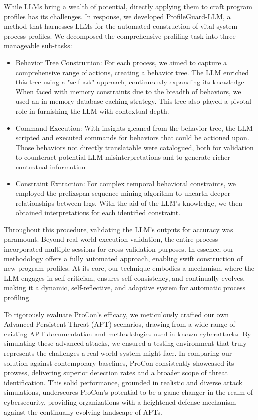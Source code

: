 While LLMs bring a wealth of potential, directly applying them to craft program profiles has its challenges. In response, we developed ProfileGuard-LLM, a method that harnesses LLMs for the automated construction of vital system process profiles. We decomposed the comprehensive profiling task into three manageable sub-tasks:
\begin{itemize}
    \item Behavior Tree Construction: For each process, we aimed to capture a comprehensive range of actions, creating a behavior tree. The LLM enriched this tree using a "self-ask" approach, continuously expanding its knowledge. When faced with memory constraints due to the breadth of behaviors, we used an in-memory database caching strategy. This tree also played a pivotal role in furnishing the LLM with contextual depth.
    \item Command Execution: With insights gleaned from the behavior tree, the LLM scripted and executed commands for behaviors that could be actioned upon. Those behaviors not directly translatable were catalogued, both for validation to counteract potential LLM misinterpretations and to generate richer contextual information.
    \item Constraint Extraction: For complex temporal behavioral constraints, we employed the prefixspan sequence mining algorithm to unearth deeper relationships between logs. With the aid of the LLM's knowledge, we then obtained interpretations for each identified constraint.
\end{itemize}
Throughout this procedure, validating the LLM's outputs for accuracy was paramount. Beyond real-world execution validation, the entire process incorporated multiple sessions for cross-validation purposes.
In essence, our methodology offers a fully automated approach, enabling swift construction of new program profiles. At its core, our technique embodies a mechanism where the LLM engages in self-criticism, ensures self-consistency, and continually evolves, making it a dynamic, self-reflective, and adaptive system for automatic process profiling.

To rigorously evaluate ProCon's efficacy, we meticulously crafted our own Advanced Persistent Threat (APT) scenarios, drawing from a wide range of existing APT documentation and methodologies used in known cyberattacks. By simulating these advanced attacks, we ensured a testing environment that truly represents the challenges a real-world system might face. In comparing our solution against contemporary baselines, ProCon consistently showcased its prowess, delivering superior detection rates and a broader scope of threat identification. This solid performance, grounded in realistic and diverse attack simulations, underscores ProCon's potential to be a game-changer in the realm of cybersecurity, providing organizations with a heightened defense mechanism against the continually evolving landscape of APTs.


